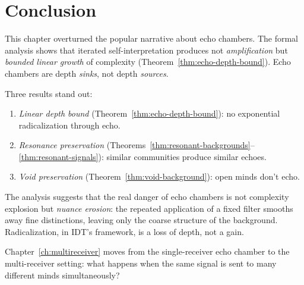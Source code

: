 \section{Conclusion}
\label{sec:echo-conclusion}

This chapter overturned the popular narrative about echo chambers.  The
formal analysis shows that iterated self-interpretation produces not
\emph{amplification} but \emph{bounded linear growth} of complexity
(Theorem~\ref{thm:echo-depth-bound}).  Echo chambers are depth
\emph{sinks}, not depth \emph{sources}.

Three results stand out:
\begin{enumerate}
  \item \emph{Linear depth bound} (Theorem~\ref{thm:echo-depth-bound}):
    no exponential radicalization through echo.
  \item \emph{Resonance preservation}
    (Theorems~\ref{thm:resonant-backgrounds}--\ref{thm:resonant-signals}):
    similar communities produce similar echoes.
  \item \emph{Void preservation} (Theorem~\ref{thm:void-background}):
    open minds don't echo.
\end{enumerate}

The analysis suggests that the real danger of echo chambers is not
complexity explosion but \emph{nuance erosion}: the repeated application of
a fixed filter smooths away fine distinctions, leaving only the coarse
structure of the background.  Radicalization, in IDT's framework, is a loss
of depth, not a gain.

Chapter~\ref{ch:multireceiver} moves from the single-receiver echo chamber
to the multi-receiver setting: what happens when the same signal is sent to
many different minds simultaneously?
